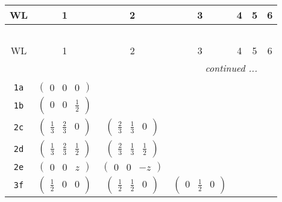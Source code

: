 \documentclass[fleqn,9pt,landscape]{jsarticle}
\begin{document}
\begin{center}
\renewcommand{\arraystretch}{1.2}
\begin{longtable}{ccccccc}
 \hline \hline
WL & 1 & 2 & 3 & 4 & 5 & 6 \\ \hline \endfirsthead

\multicolumn{6}{l}{\tablename\ \thetable{}} \\
 \hline \hline
WL & 1 & 2 & 3 & 4 & 5 & 6 \\ \hline \endhead

 \hline \hline
\multicolumn{6}{r}{\footnotesize\it continued ...} \\ \endfoot

 \hline \hline
\multicolumn{6}{r}{} \\ \endlastfoot

{\tt 1a} & $ \begin{pmatrix} 0 & 0 & 0 \end{pmatrix} $ & $  $ & $  $ & $  $ & $  $ & $  $ \\ \hline
{\tt 1b} & $ \begin{pmatrix} 0 & 0 & \frac{1}{2} \end{pmatrix} $ & $  $ & $  $ & $  $ & $  $ & $  $ \\ \hline
{\tt 2c} & $ \begin{pmatrix} \frac{1}{3} & \frac{2}{3} & 0 \end{pmatrix} $ & $ \begin{pmatrix} \frac{2}{3} & \frac{1}{3} & 0 \end{pmatrix} $ & $  $ & $  $ & $  $ & $  $ \\ \hline
{\tt 2d} & $ \begin{pmatrix} \frac{1}{3} & \frac{2}{3} & \frac{1}{2} \end{pmatrix} $ & $ \begin{pmatrix} \frac{2}{3} & \frac{1}{3} & \frac{1}{2} \end{pmatrix} $ & $  $ & $  $ & $  $ & $  $ \\ \hline
{\tt 2e} & $ \begin{pmatrix} 0 & 0 & z \end{pmatrix} $ & $ \begin{pmatrix} 0 & 0 & - z \end{pmatrix} $ & $  $ & $  $ & $  $ & $  $ \\ \hline
{\tt 3f} & $ \begin{pmatrix} \frac{1}{2} & 0 & 0 \end{pmatrix} $ & $ \begin{pmatrix} \frac{1}{2} & \frac{1}{2} & 0 \end{pmatrix} $ & $ \begin{pmatrix} 0 & \frac{1}{2} & 0 \end{pmatrix} $ & $  $ & $  $ & $  $ \\ \hline

\end{longtable}
\end{center}
\end{document}
